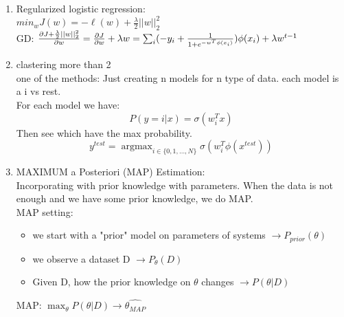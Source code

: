 \documentclass[12pt]{article}
\DeclareMathOperator*{\argmax}{\arg\max}
\begin{document}
\begin{multicols}{2}
\begin{enumerate}
            \item Regularized logistic regression:\\
            $min_w J(w) = -\ell(w) + \frac{\lambda}{2}||w||_2^2$ \\
            GD: $\frac{\partial J + \frac{\lambda}{2}||w||_2^2}{\partial w} = \frac{\partial J}{\partial w} + \lambda w\\
            = \sum_i (-y_i + \frac{1}{1 + e^{-w^T\phi(x_i)}})\phi(x_i) + \lambda w^{t-1}$

            \item clastering more than 2\\
            one of the methods: Just creating n models for n type of data. each model is a i vs rest.\\
            For each model we have:
            $$P(y = i | x) = \sigma(w_i^T x)$$
            Then see which have the max probability.
            $$y^{test} = \argmax_{i \in \{0,1,\dots, N\}} \sigma (w^T_i \phi(x^{test}))$$

            \item MAXIMUM a Posteriori (MAP) Estimation:\\
            Incorporating with prior knowledge with parameters. When the data is not enough and we have some prior knowledge, we do MAP.\\
            MAP setting: 
            \begin{itemize}
                \item we start with a "prior" model on parameters of systems $\rightarrow P_{prior}(\theta)$
                \item we observe a dataset D $\rightarrow P_\theta(D)$
                \item Given D, how the prior knowledge on $\theta$ changes $\rightarrow P(\theta | D)$
            \end{itemize}
            MAP: $\max_\theta P(\theta | D) \rightarrow \hat{\theta_{MAP}}$
        \end{enumerate}
        
        \newpage
    \end{multicols}

    \newpage
    
\end{document}
